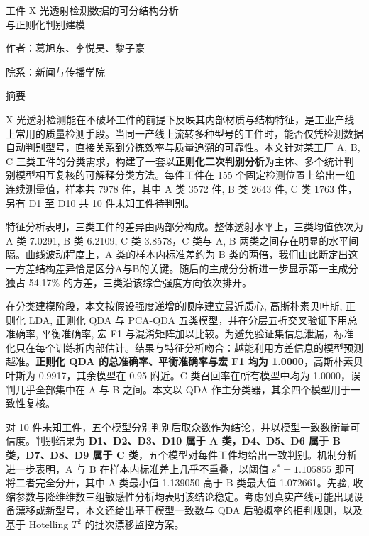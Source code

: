 \documentclass[12pt,a4paper]{article}
\newcommand{\jiacu}[1]{\textbf{\bfseries\heiti #1}}
\begin{document}
\songti\linespread{1}\selectfont
\hypersetup{pageanchor=false}

\begin{titlepage}
\thispagestyle{empty}
\centering
\vspace*{8em}
{\heiti 工件 X 光透射检测数据的可分结构分析\\[0.5em]与正则化判别建模\par}
\vspace{6em}
{\songti 作者：葛旭东、李悦昊、黎子豪\par}
\vspace{2em}
{\songti 院系：新闻与传播学院\par}
\vfill
\end{titlepage}

\thispagestyle{empty}
\begin{center}
	{\heiti 摘\quad 要}
\end{center}

X 光透射检测能在不破坏工件的前提下反映其内部材质与结构特征，是工业产线上常用的质量检测手段。当同一产线上流转多种型号的工件时，能否仅凭检测数据自动判别型号，直接关系到分拣效率与质量追溯的可靠性。本文针对某工厂 A, B, C 三类工件的分类需求，构建了一套以\jiacu{正则化二次判别分析}为主体、多个统计判别模型相互复核的可解释分类方法。每件工件在 155 个固定检测位置上给出一组连续测量值，样本共 7978 件，其中 A 类 3572 件, B 类 2643 件, C 类 1763 件，另有 D1 至 D10 共 10 件未知工件待判别。

特征分析表明，三类工件的差异由两部分构成。整体透射水平上，三类均值依次为 A 类 7.0291, B 类 6.2109, C 类 3.8578，C 类与 A, B 两类之间存在明显的水平间隔。曲线波动程度上，A 类的样本内标准差约为 B 类的两倍，我们由此断定出这一方差结构差异恰是区分A与B的关键。随后的主成分分析进一步显示第一主成分独占 54.17\% 的方差，三类沿该综合强度方向依次排开。

在分类建模阶段，本文按假设强度递增的顺序建立最近质心, 高斯朴素贝叶斯, 正则化 LDA, 正则化 QDA 与 PCA-QDA 五类模型，并在分层五折交叉验证下用总准确率, 平衡准确率, 宏 F1 与混淆矩阵加以比较。为避免验证集信息泄漏，标准化只在每个训练折内部估计。结果与特征分析吻合：越能利用方差信息的模型预测越准。\jiacu{正则化 QDA 的总准确率、平衡准确率与宏 F1 均为 1.0000}，高斯朴素贝叶斯为 0.9917，其余模型在 0.95 附近。C 类召回率在所有模型中均为 1.0000，误判几乎全部集中在 A 与 B 之间。本文以 QDA 作主分类器，其余四个模型用于一致性复核。

对 10 件未知工件，五个模型分别判别后取众数作为结论，并以模型一致数衡量可信度。判别结果为 \jiacu{D1、D2、D3、D10 属于 A 类，D4、D5、D6 属于 B 类，D7、D8、D9 属于 C 类}，五个模型对每件工件均给出一致判别。机制分析进一步表明，A 与 B 在样本内标准差上几乎不重叠，以阈值 $s^*=1.105855$ 即可将二者完全分开，其中 A 类最小值 1.139050 高于 B 类最大值 1.072661。先验, 收缩参数与降维维数三组敏感性分析均表明该结论稳定。考虑到真实产线可能出现设备漂移或新型号，本文还给出基于模型一致数与 QDA 后验概率的拒判规则，以及基于 Hotelling $T^2$ 的批次漂移监控方案。
\end{document}
